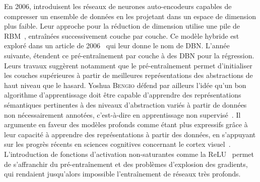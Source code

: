 En 2006, \citet{hinton_reducing_2006} introduisent les réseaux de neurones auto-encodeurs capables de compresser un ensemble de données en les projetant dans un espace de dimension plus faible. Leur approche pour la réduction de dimension utilise une pile de \gls{RBM}~\cite{ackley_learning_1985,salakhutdinov_deep_2009}, entraînées successivement couche par couche. Ce modèle hybride est exploré dans un article de 2006~\cite{hinton_fast_2006} qui leur donne le nom de \gls{DBN}. L'année suivante, \citet{bengio_greedy_2007} étendent ce pré-entraînement par couche à des \gls{DBN} pour la régression. Leurs travaux suggèrent notamment que le pré-entraînement permet d'initialiser les couches supérieures à partir de meilleures représentations des abstractions de haut niveau que le hasard. Yoshua \textsc{Bengio} défend par ailleurs l'idée qu'un bon algorithme d'apprentissage doit être capable d'apprendre des représentations sémantiques pertinentes à des niveaux d'abstraction variés à partir de données non nécessairement annotées, c'est-à-dire en apprentissage non supervisé~\cite{bengio_learning_2009}. Il argumente en faveur des modèles profonds comme étant plus expressifs grâce à leur capacité à apprendre des représentations à partir des données, en s'appuyant sur les progrès récents en sciences cognitives concernant le cortex visuel~\cite{serre_quantitative_2007}. L'introduction de fonctions d'activation non-saturantes comme la \gls{ReLU}~\cite{glorot_deep_2011} permet de s'affranchir du pré-entraînement et des problèmes d'explosion des gradients, qui rendaient jusqu'alors impossible l'entraînement de réseaux très profonds.

